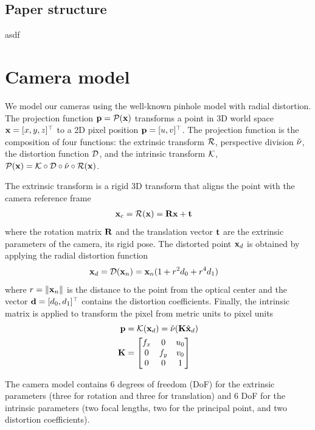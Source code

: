\documentclass[10pt,twocolumn,letterpaper]{article}
\begin{document}
\subsection{Paper structure}
asdf

\section{Camera model}

We model our cameras using the well-known pinhole model with radial distortion. The projection function $\mathbf{p}=\mathcal{P}(\mathbf{x})$ transforms a point in 3D world space $\mathbf{x}=[x,y,z]^\top$ to a 2D pixel position $\mathbf{p}=[u,v]^\top$. The projection function is the composition of four functions: the extrinsic transform $\mathcal{R}$, perspective division $\check{\nu}$, the distortion function $\mathcal{D}$, and the intrinsic transform $\mathcal{K}$, \ie $\mathcal{P}(\mathbf{x}) = \mathcal{K} \circ \mathcal{D} \circ \check{\nu} \circ \mathcal{R}(\mathbf{x})$.

The extrinsic transform is a rigid 3D transform that aligns the point with the camera reference frame
%
\begin{align}
\mathbf{x}_c &= \mathcal{R}(\mathbf{x}) = \mathbf{R} \mathbf{x} + \mathbf{t} 
\end{align}
%
where the rotation matrix $\mathbf{R}$ and the translation vector $\mathbf{t}$ are the extrinsic parameters of the camera, \ie its rigid pose. The distorted point $\mathbf{x}_d$ is obtained by applying the radial distortion function
%
\begin{align}
\mathbf{x}_d = \mathcal{D}(\mathbf{x}_n) &= \mathbf{x}_n (1+r^2 d_0 + r^4 d_1)
\label{eq:distortion}
\end{align}
%
where $r = \lVert\mathbf{x}_n\rVert$ is the distance to the point from the optical center and the vector $\mathbf{d}=[d_0,d_1]^\top$ contains the distortion coefficients. Finally, the intrinsic matrix is applied to transform the pixel from metric units to pixel units
%
\begin{align}
\mathbf{p} &= \mathcal{K}(\mathbf{x}_d) = \check{\nu}(\mathbf{K} \hat{\mathbf{x}}_d)
\\
\mathbf{K} &= \begin{bmatrix}
f_x & 0 & u_0 \\
0 & f_y & v_0 \\
0 & 0 & 1
\end{bmatrix}
\label{eq:intrinsic_matrix}
\end{align}
%

The camera model contains 6 degrees of freedom (DoF) for the extrinsic parameters (three for rotation and three for translation) and 6 DoF for the intrinsic parameters (two focal lengths, two for the principal point, and two distortion coefficients). 
\end{document}
